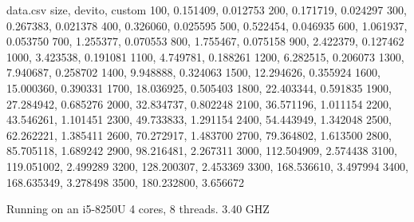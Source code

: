 \documentclass{article}
\begin{document}
\begin{filecontents*}{data.csv}
	size, devito, custom
	100, 0.151409, 0.012753
	200, 0.171719, 0.024297
	300, 0.267383, 0.021378
	400, 0.326060, 0.025595
	500, 0.522454, 0.046935
	600, 1.061937, 0.053750
	700, 1.255377, 0.070553
	800, 1.755467, 0.075158
	900, 2.422379, 0.127462
	1000, 3.423538, 0.191081
	1100, 4.749781, 0.188261
	1200, 6.282515, 0.206073
	1300, 7.940687, 0.258702
	1400, 9.948888, 0.324063
	1500, 12.294626, 0.355924
	1600, 15.000360, 0.390331
	1700, 18.036925, 0.505403
	1800, 22.403344, 0.591835
	1900, 27.284942, 0.685276
	2000, 32.834737, 0.802248
	2100, 36.571196, 1.011154
	2200, 43.546261, 1.101451
	2300, 49.733833, 1.291154
	2400, 54.443949, 1.342048
	2500, 62.262221, 1.385411
	2600, 70.272917, 1.483700
	2700, 79.364802, 1.613500
	2800, 85.705118, 1.689242
	2900, 98.216481, 2.267311
	3000, 112.504909, 2.574438
	3100, 119.051002, 2.499289
	3200, 128.200307, 2.453369
	3300, 168.536610, 3.497994
	3400, 168.635349, 3.278498
	3500, 180.232800, 3.656672
\end{filecontents*}
Running on an i5-8250U 4 cores, 8 threads. 3.40 GHZ \\ \\
\end{document}
